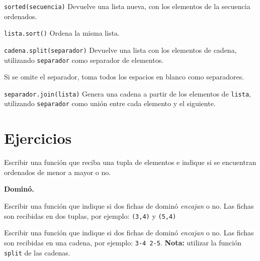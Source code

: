 \begin{referencia_python}
\begin{sintaxis}{\lstinline!sorted(secuencia)!}
Devuelve una lista nueva, con los elementos de la secuencia ordenados.
\end{sintaxis}

\begin{sintaxis}{\lstinline!lista.sort()!}
Ordena la misma lista.
\end{sintaxis}

\begin{sintaxis}{\lstinline!cadena.split(separador)!}
Devuelve una lista con los elementos de cadena, utilizando
\lstinline!separador! como separador de elementos.

Si se omite el separador, toma todos los espacios en blanco como
separadores.
\end{sintaxis}

\begin{sintaxis}{\lstinline!separador.join(lista)!}
Genera una cadena a partir de los elementos de \lstinline!lista!,
utilizando \lstinline!separador! como unión entre cada elemento y el
siguiente.
\end{sintaxis}
\end{referencia_python}


\newpage
\section{Ejercicios}

\begin{ejercicio}
Escribir una función que reciba una tupla de elementos e indique si se
encuentran ordenados de menor a mayor o no.
\end{ejercicio}


\begin{ejercicio}
{\bf Dominó.}
\begin{partes}
\item Escribir una función que indique si dos fichas de dominó
\emph{encajan} o no. Las fichas son recibidas en dos tuplas, por ejemplo:
\verb!(3,4)! y \verb!(5,4)!
\item Escribir una función que indique si dos fichas de dominó
\emph{encajan} o no. Las fichas son recibidas en una cadena, por ejemplo:
\verb!3-4 2-5!. {\bf Nota:} utilizar la función \verb!split! de las cadenas.
\end{partes}
\end{ejercicio}


